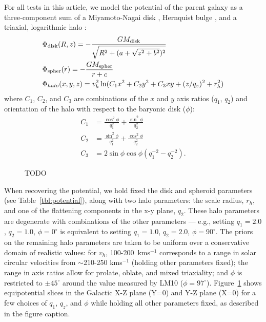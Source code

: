 \documentclass[letterpaper,12pt,preprint]{aastex}
\begin{document}
For all tests in this article, we model the potential of the parent galaxy as a three-component sum of a Miyamoto-Nagai disk \citep{}, Hernquist bulge \citep[spheroid;][]{}, and a triaxial, logarithmic halo \citep[e.g.,][]{law10}:
\begin{align}
	&\Phi_{\rm disk}(R,z) = -\frac{GM_{\rm disk}}{\sqrt{R^2 + (a + \sqrt{z^2 + b^2})^2}}\\
	&\Phi_{\rm spher}(r) = -\frac{GM_{\rm spher}}{r + c}\\
	&\Phi_{halo}(x,y,z) = v_{h}^2 \ln(C_1 x^2 + C_2 y^2 + C_3 xy + (z/q_z)^2 + r_h^2)
\end{align}
where $C_1$, $C_2$, and $C_3$ are combinations of the $x$ and $y$ axis
ratios ($q_1$, $q_2$) and orientation of the halo with respect to the
baryonic disk ($\phi$):
\begin{align}
  C_1 &= \frac{\cos^2\phi}{q_1^2} + \frac{\sin^2\phi}{q_2^2}\\
  C_2 &= \frac{\sin^2\phi}{q_1^2} + \frac{\cos^2\phi}{q_2^2}\\
  C_3 &= 2\sin\phi\cos\phi \left(q_1^{-2} - q_2^{-2}\right).
\end{align}

\begin{figure}[h]
\begin{center}
\caption{ TODO }\label{fig:potential}
\end{center}
\end{figure}
 
When recovering the potential, we hold fixed the disk and spheroid parameters (see Table~\ref{tbl:potential}), along with two halo parameters: the scale radius, $r_h$, and one of the flattening components in the x-y plane, $q_2$. These halo parameters are degenerate with combinations of the other parameters --- e.g., setting $q_1=2.0$, $q_2=1.0$, $\phi=0^\circ$ is equivalent to setting $q_1=1.0$, $q_2=2.0$, $\phi=90^\circ$. The priors on the remaining halo parameters are taken to be uniform over a conservative domain of realistic values: for $v_h$, 100-200~kms$^{-1}$ corresponds to a range in solar circular velocities from $\sim$210-250 kms$^{-1}$ (holding other parameters fixed); the range in axis ratios allow for prolate, oblate, and mixed triaxiality; and $\phi$ is restricted to $\pm45^\circ$ around the value measured by LM10 ($\phi = 97^\circ$). Figure~\ref{fig:potential} shows equipotential slices in the Galactic X-Z plane (Y=0) and Y-Z plane (X=0) for a few choices of  $q_1$,  $q_z$, and $\phi$ while holding all other parameters fixed, as described in the figure caption.
\end{document}
